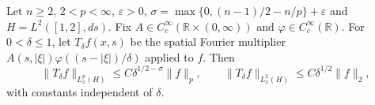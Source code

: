 Let $n\ge2$, $2<p<\infty$, $\varepsilon>0$, $\sigma=\max\{0,(n-1)/2-n/p\}+\varepsilon$ and $H=L^2([1,2],ds)$. Fix $A\in C_c^\infty(\mathbb R\times(0,\infty))$ and $\varphi\in C_c^\infty(\mathbb R)$. For $0<\delta\le1$, let $T_\delta f(x,s)$ be the spatial Fourier multiplier $A(s,|\xi|)\varphi((s-|\xi|)/\delta)$ applied to $f$. Then
\[
\|T_\delta f\|_{L_x^p(H)}\le C\delta^{1/2-\sigma}\|f\|_p,
\qquad
\|T_\delta f\|_{L_x^2(H)}\le C\delta^{1/2}\|f\|_2,
\]
with constants independent of $\delta$.
